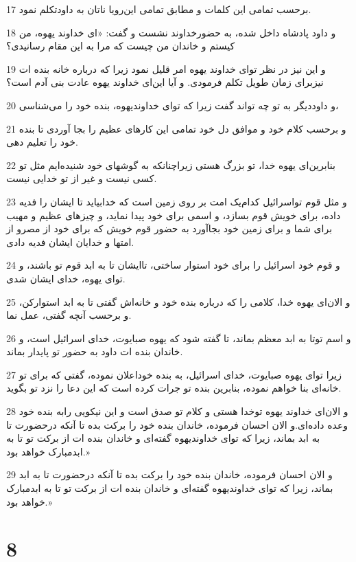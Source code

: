 \par 17 بر‌حسب تمامی این کلمات و مطابق تمامی این‌رویا ناتان به داودتکلم نمود.
\par 18 و داود پادشاه داخل شده، به حضورخداوند نشست و گفت: «ای خداوند یهوه، من کیستم و خاندان من چیست که مرا به این مقام رسانیدی؟
\par 19 و این نیز در نظر تو‌ای خداوند یهوه امر قلیل نمود زیرا که درباره خانه بنده ات نیزبرای زمان طویل تکلم فرمودی. و آیا این‌ای خداوند یهوه عادت بنی آدم است؟
\par 20 و داوددیگر به تو چه تواند گفت زیرا که تو‌ای خداوندیهوه، بنده خود را می‌شناسی،
\par 21 و بر‌حسب کلام خود و موافق دل خود تمامی این کارهای عظیم را بجا آوردی تا بنده خود را تعلیم دهی.
\par 22 بنابرین‌ای یهوه خدا، تو بزرگ هستی زیراچنانکه به گوشهای خود شنیده‌ایم مثل تو کسی نیست و غیر از تو خدایی نیست.
\par 23 و مثل قوم تواسرائیل کدام‌یک امت بر روی زمین است که خدابیاید تا ایشان را فدیه داده، برای خویش قوم بسازد، و اسمی برای خود پیدا نماید، و چیزهای عظیم و مهیب برای شما و برای زمین خود بجاآورد به حضور قوم خویش که برای خود از مصرو از امتها و خدایان ایشان فدیه دادی.
\par 24 و قوم خود اسرائیل را برای خود استوار ساختی، تاایشان تا به ابد قوم تو باشند، و تو‌ای یهوه، خدای ایشان شدی.
\par 25 و الان‌ای یهوه خدا، کلامی را که درباره بنده خود و خانه‌اش گفتی تا به ابد استوارکن، و بر‌حسب آنچه گفتی، عمل نما.
\par 26 و اسم توتا به ابد معظم بماند، تا گفته شود که یهوه صبایوت، خدای اسرائیل است، و خاندان بنده ات داود به حضور تو پایدار بماند.
\par 27 زیرا توای یهوه صبایوت، خدای اسرائیل، به بنده خوداعلان نموده، گفتی که برای تو خانه‌ای بنا خواهم نموده، بنابرین بنده تو جرات کرده است که این دعا را نزد تو بگوید.
\par 28 و الان‌ای خداوند یهوه توخدا هستی و کلام تو صدق است و این نیکویی رابه بنده خود وعده داده‌ای.و الان احسان فرموده، خاندان بنده خود را برکت بده تا آنکه درحضورت تا به ابد بماند، زیرا که تو‌ای خداوندیهوه گفته‌ای و خاندان بنده ات از برکت تو تا به ابدمبارک خواهد بود.»
\par 29 و الان احسان فرموده، خاندان بنده خود را برکت بده تا آنکه درحضورت تا به ابد بماند، زیرا که تو‌ای خداوندیهوه گفته‌ای و خاندان بنده ات از برکت تو تا به ابدمبارک خواهد بود.»
 
\chapter{8}

